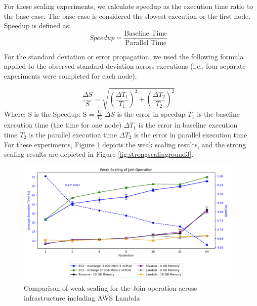 For these scaling experiments, we calculate speedup as the execution time ratio to the base case.  The base case is considered the slowest execution or the first node.  Speedup is defined as:
\[
    Speedup = \frac{\text{Baseline Time}}{\text{Parallel Time}}
\]

For the standard deviation or error propagation, we used the following formula applied to the observed standard deviation across executions (i.e., four separate experiments were completed for each node).

\[
    \frac{\Delta{S}}{S} = \sqrt{\left(\frac{\Delta{T_1}}{T_1}\right)^2 + \left(\frac{\Delta{T_2}}{T_2}\right)^2}
\]
\newline
Where:
\newline
\newline
S is the Speedup: S = $\frac{T_1}{T_2}$
\newline
\newline
$\Delta{S}$ is the error in speedup
\newline
\newline
$T_1$ is the baseline execution time (the time for one node)
\newline
\newline
$\Delta{T}_1$ is the error in baseline execution time
\newline
\newline
$T_2$ is the parallel execution time
\newline
\newline
$\Delta{T}_2$ is the error in parallel execution time
\newline
\newline
For these experiments, Figure \ref{fig:weakscalinground3} depicts the weak scaling results, and the strong scaling results are depicted in Figure \ref{fig:strongscalinground3}. 


\begin{figure}[ht]
    \begin{center}
    \includegraphics[width=\linewidth]{source/Figure/weekscalinground3.png}
    \end{center}
    \caption{Comparison of weak scaling for the Join operation across infrastructure including AWS Lambda}
    \label{fig:weakscalinground3}
\end{figure}

